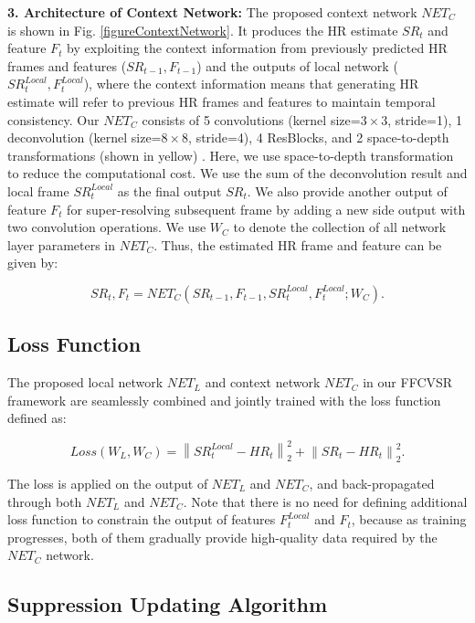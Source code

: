 \documentclass[letterpaper]{article} %
\begin{document}
\textbf{3. Architecture of Context Network:} The proposed context network $NET_C$ is shown in Fig. \ref{figureContextNetwork}. It produces the HR estimate $SR_t$ and feature $F_t$ by exploiting the context information from previously predicted HR frames and features ($SR_{t-1}, F_{t-1}$) and the outputs of local network ($SR^{Local}_t, F^{Local}_t$), where the context information means that generating HR estimate will refer to previous HR frames and features to maintain temporal consistency. Our $NET_C$ consists of 5 convolutions (kernel size=$3\times3$, stride=1), 1 deconvolution (kernel size=$8\times8$, stride=4), 4 ResBlocks, and 2 space-to-depth transformations (shown in yellow) \cite{FRVSR2018cvpr}. Here, we use space-to-depth transformation to reduce the computational cost. We use the sum of the deconvolution result and local frame $SR^{Local}_t$ as the final output $SR_t$. We also provide another output of feature $F_t$ for super-resolving subsequent frame by adding a new side output with two convolution operations. We use $W_C$ to denote the collection of all network layer parameters in $NET_C$. Thus, the estimated HR frame and feature can be given by:

\begin{equation}
SR_t, F_t = NET_C(SR_{t-1}, F_{t-1}, SR^{Local}_t, F^{Local}_t; W_C).
\label{equationContextNetwork}
\end{equation}


\subsection{Loss Function}


The proposed local network $NET_L$ and context network $NET_C$ in our FFCVSR framework are seamlessly combined and jointly trained with the loss function defined as:

\begin{equation}
Loss(W_L, W_C) = \left \| SR^{Local}_t - HR_t \right \|^2_2 + \left \| SR_t - HR_t \right \|^2_2.
\label{LossFunction}
\end{equation}

The loss is applied on the output of $NET_L$ and $NET_C$, and back-propagated through both $NET_L$ and $NET_C$. Note that there is no need for defining additional loss function to constrain the output of features $F^{Local}_t$ and $F_t$, because as training progresses, both of them gradually provide high-quality data required by the $NET_C$ network.


\subsection{Suppression Updating Algorithm}
\end{document}
